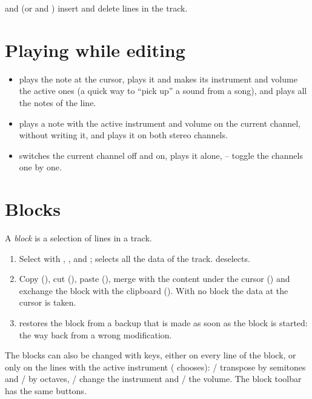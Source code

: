  and  (or  and ) insert and delete lines in the track.

\section{Playing while editing}

\begin{itemize}
  \item {} plays the note at the cursor,  plays it and makes its instrument and volume the active ones
        (a quick way to ``pick up'' a sound from a song), and  plays all the notes of the line.
  \item {} plays a note with the active instrument and volume on the current channel, without writing it, and
         plays it on both stereo channels.
  \item {} switches the current channel off and on,  plays it alone, -- toggle
        the channels one by one.
\end{itemize}

\section{Blocks}

A \emph{block} is a selection of lines in a track.

\begin{enumerate}
  \item Select with , ,  and ;  selects all the data of the
        track.  deselects.
  \item Copy (), cut (), paste (), merge with the content under the cursor
        () and exchange the block with the clipboard (). With no block the data at the cursor
        is taken.
  \item {} restores the block from a backup that is made as soon as the block is started: the way back from a wrong
        modification.
\end{enumerate}

The blocks can also be changed with keys, either on every line of the block, or only on the lines with the active instrument
( chooses): / transpose by semitones and / by octaves,
/ change the instrument and / the volume. The block toolbar has the same
buttons.

